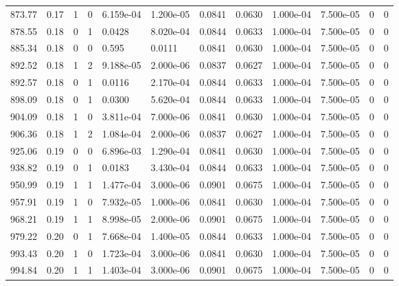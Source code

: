 \documentclass[preview]{standalone}
\begin{document}
{{{\begin{tabular}{L{1.2cm}C{1.2cm} C{0.3cm}C{0.5cm} C{1.4cm}C{1.4cm} C{1.4cm}C{1.4cm} C{1.6cm}C{1.6cm} C{1.6cm}C{1.6cm}}
  873.77  &  0.17  & 1     &  0 &  6.159e-04  & 1.200e-05  &  0.0841&   0.0630& 1.000e-04 & 7.500e-05   &  0 & 0  \\ 
  878.55  &  0.18  & 0     &  1 &  0.0428  & 8.020e-04  &  0.0844&   0.0633& 1.000e-04 & 7.500e-05   &  0 & 0  \\ 
  885.34  &  0.18  & 0     &  0 &  0.595  & 0.0111  &  0.0841&   0.0630& 1.000e-04 & 7.500e-05   &  0 & 0  \\ 
  892.52  &  0.18  & 1     &  2 &  9.188e-05  & 2.000e-06  &  0.0837&   0.0627& 1.000e-04 & 7.500e-05   &  0 & 0  \\ 
  892.57  &  0.18  & 0     &  1 &  0.0116  & 2.170e-04  &  0.0844&   0.0633& 1.000e-04 & 7.500e-05   &  0 & 0  \\ 
  898.09  &  0.18  & 0     &  1 &  0.0300  & 5.620e-04  &  0.0844&   0.0633& 1.000e-04 & 7.500e-05   &  0 & 0  \\ 
  904.09  &  0.18  & 1     &  0 &  3.811e-04  & 7.000e-06  &  0.0841&   0.0630& 1.000e-04 & 7.500e-05   &  0 & 0  \\ 
  906.36  &  0.18  & 1     &  2 &  1.084e-04  & 2.000e-06  &  0.0837&   0.0627& 1.000e-04 & 7.500e-05   &  0 & 0  \\ 
  925.06  &  0.19  & 0     &  0 &  6.896e-03  & 1.290e-04  &  0.0841&   0.0630& 1.000e-04 & 7.500e-05   &  0 & 0  \\ 
  938.82  &  0.19  & 0     &  1 &  0.0183  & 3.430e-04  &  0.0844&   0.0633& 1.000e-04 & 7.500e-05   &  0 & 0  \\ 
  950.99  &  0.19  & 1     &  1 &  1.477e-04  & 3.000e-06  &  0.0901&   0.0675& 1.000e-04 & 7.500e-05   &  0 & 0  \\ 
  957.91  &  0.19  & 1     &  0 &  7.932e-05  & 1.000e-06  &  0.0841&   0.0630& 1.000e-04 & 7.500e-05   &  0 & 0  \\ 
  968.21  &  0.19  & 1     &  1 &  8.998e-05  & 2.000e-06  &  0.0901&   0.0675& 1.000e-04 & 7.500e-05   &  0 & 0  \\ 
  979.22  &  0.20  & 0     &  1 &  7.668e-04  & 1.400e-05  &  0.0844&   0.0633& 1.000e-04 & 7.500e-05   &  0 & 0  \\ 
  993.43  &  0.20  & 1     &  0 &  1.723e-04  & 3.000e-06  &  0.0841&   0.0630& 1.000e-04 & 7.500e-05   &  0 & 0  \\ 
  994.84  &  0.20  & 1     &  1 &  1.403e-04  & 3.000e-06  &  0.0901&   0.0675& 1.000e-04 & 7.500e-05   &  0 & 0  \\ 
\hline 
\end{tabular} 

}}}
\end{document}
